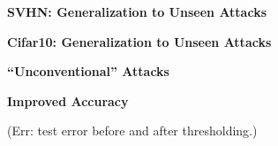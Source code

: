 \documentclass[64pt]{beamer}
\begin{document}
	\begin{frame}{\bfseries SVHN: Generalization to Unseen Attacks}
		\Large 
		\begin{table}
			\centering
			
		\end{table}
	\end{frame}

	\begin{frame}{\bfseries Cifar10: Generalization to Unseen Attacks}
		\Large 
		\begin{table}
			\centering
			
		\end{table}
	\end{frame}

	\begin{frame}{\bfseries ``Unconventional'' Attacks}
		\Large
		
		\vspace*{-0.5cm} 
		\begin{table}
			\centering
			
		\end{table}
	\end{frame}

	\begin{frame}{\bfseries Improved Accuracy}
		\Large
		
		\vspace*{-1.25cm}
		\begin{table}
			\centering
			\begin{minipage}[t]{0.5\textwidth}
				\vspace*{0px}
				
				
			\end{minipage}
			\begin{minipage}[t]{0.29\textwidth}
				\vspace*{0px}
				 
				
			\end{minipage}
			\vspace*{2px}
			
			\large
			\raggedright
			\hspace*{1.2cm}(Err: test error before and after thresholding.)
		\end{table}
	\end{frame}
\end{document}
